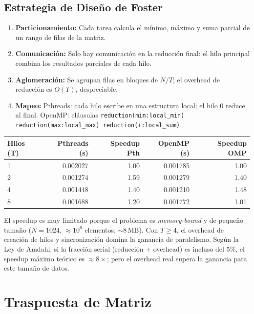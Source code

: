 \documentclass[11pt,a4paper]{article}
\begin{document}
\subsection*{Estrategia de Diseño de Foster}
\begin{enumerate}
    \item \textbf{Particionamiento:} Cada tarea calcula el mínimo, máximo y suma parcial de un rango de filas de la matriz.
    \item \textbf{Comunicación:} Solo hay comunicación en la reducción final: el hilo principal combina los resultados parciales de cada hilo.
    \item \textbf{Aglomeración:} Se agrupan filas en bloques de $N/T$; el overhead de reducción es $O(T)$, despreciable.
    \item \textbf{Mapeo:} Pthreads: cada hilo escribe en una estructura local; el hilo 0 reduce al final. OpenMP: cláusulas \texttt{reduction(min:local\_min) reduction(max:local\_max) reduction(+:local\_sum)}.
\end{enumerate}

\begin{center}
\begin{tabular}{|l|r|r|r|r|}
\hline
\textbf{Hilos (T)} & \textbf{Pthreads (s)} & \textbf{Speedup Pth} & \textbf{OpenMP (s)} & \textbf{Speedup OMP} \\
\hline
1 & 0.002027 & 1.00 & 0.001785 & 1.00 \\
2 & 0.001274 & 1.59 & 0.001279 & 1.40 \\
4 & 0.001448 & 1.40 & 0.001210 & 1.48 \\
8 & 0.001688 & 1.20 & 0.001772 & 1.01 \\
\hline
\end{tabular}
\end{center}

El speedup es muy limitado porque el problema es \emph{memory-bound} y de pequeño tamaño ($N=1024$, $\approx 10^6$ elementos, $\sim 8\,\text{MB}$). Con $T \geq 4$, el overhead de creación de hilos y sincronización domina la ganancia de paralelismo. Según la Ley de Amdahl, si la fracción serial (reducción + overhead) es incluso del 5\%, el speedup máximo teórico es $\approx 8\times$; pero el overhead real supera la ganancia para este tamaño de datos.

\section{Traspuesta de Matriz}
\end{document}
